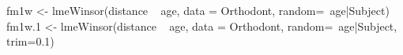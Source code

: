 \begin{SeeAlso}\relax
{} 
\end{SeeAlso}
\begin{Examples}
\begin{ExampleCode}
fm1w <- lmeWinsor(distance ~ age, data = Orthodont,
                 random=~age|Subject) 
fm1w.1 <- lmeWinsor(distance ~ age, data = Orthodont,
                 random=~age|Subject, trim=0.1) 
\end{ExampleCode}
\end{Examples}

